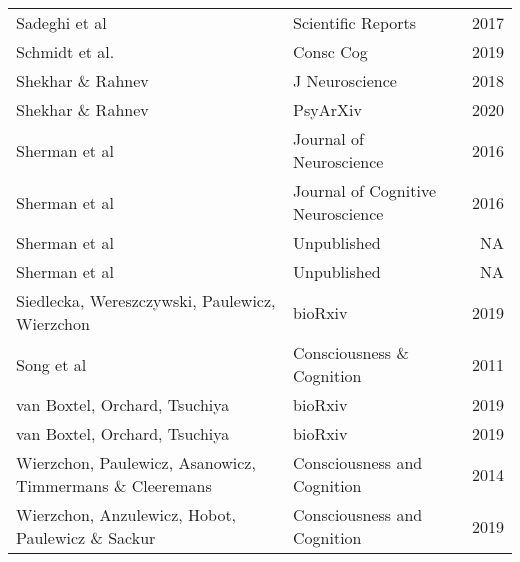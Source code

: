 \documentclass[
]{article}
\begin{document}
\begin{longtable}[t]{llr}
Sadeghi et al & Scientific Reports & 2017\\
Schmidt et al. & Consc Cog & 2019\\
Shekhar \& Rahnev & J Neuroscience & 2018\\
\addlinespace
Shekhar \& Rahnev & PsyArXiv & 2020\\
Sherman et al & Journal of Neuroscience & 2016\\
Sherman et al & Journal of Cognitive Neuroscience & 2016\\
Sherman et al & Unpublished & NA\\
Sherman et al & Unpublished & NA\\
\addlinespace
Siedlecka, Wereszczywski, Paulewicz, Wierzchon & bioRxiv & 2019\\
Song et al & Consciousness \& Cognition & 2011\\
van Boxtel, Orchard, Tsuchiya & bioRxiv & 2019\\
van Boxtel, Orchard, Tsuchiya & bioRxiv & 2019\\
Wierzchon, Paulewicz, Asanowicz, Timmermans \& Cleeremans & Consciousness and Cognition & 2014\\
\addlinespace
Wierzchon, Anzulewicz, Hobot, Paulewicz \& Sackur & Consciousness and Cognition & 2019\\*
\end{longtable}
\endgroup{}
\end{document}
